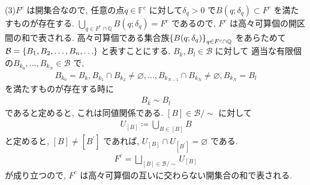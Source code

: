 \documentclass[10pt, fleqn, label-section=none]{bxjsarticle}
\theoremstyle{definition}
\newcommand{\cbra}[1]{\mleft\{#1\mright\}}
\renewcommand{\;}{\, ; \,}
\begin{document}
(3)$F^c$ は開集合なので, 任意の点$q \in \mathbb F^c$ に対して$\delta_q > 0$ で$B(q; \delta_q) \subset F^c$ を満たすものが存在する. $\bigcup_{q \in F^c \cap \mathbb Q} B(q; \delta_q) = F^c$ であるので, $F^c$ は高々可算個の開区間の和で表される. 高々可算個である集合族$\cbra{B(q; \delta_q)}_{q \in F^c \cap \mathbb Q}$ をあらためて$\mathcal B = \cbra{B_1, B_2, \ldots , B_n, \ldots }$ と表すことにする. 
$B_k, B_l \in \mathcal B$ に対して
適当な有限個の$B_{k_0}, \ldots , B_{k_N} \in \mathcal B$ で, 
\begin{align*} B_{k_0} = B_k, B_{k_1} \cap B_{k_2} \neq \varnothing, \ldots, B_{k_{N-1}} \cap B_{k_N} \neq \varnothing, B_{k_N} = B_l\end{align*}
を満たすものが存在する時に
\begin{align*} B_k \sim B_l \end{align*}
であると定めると, これは同値関係である. $[B] \in \mathcal B / \sim$ に対して
\begin{align*} U_{[B] }\coloneqq \bigcup_{B \in [B]} B \end{align*}
と定めると, $[B] \neq [B^\prime ] $ であれば, $U_{[B]} \cap U_{[B^\prime]} = \varnothing$ である. 
\begin{align*} F^c = \bigsqcup_{[B] \in \mathcal B / \sim} U_{[B]}   \end{align*}
が成り立つので, $F^c$ は高々可算個の互いに交わらない開集合の和で表される. 
\end{document}
